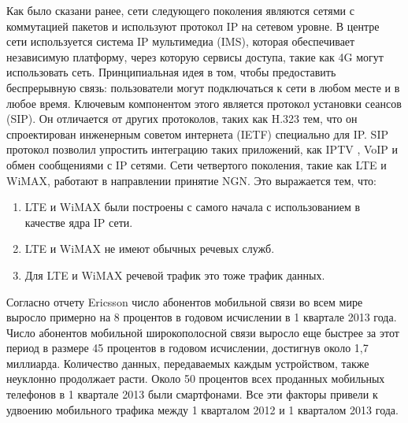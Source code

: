 Как было сказани ранее, сети следующего поколения являются сетями с коммутацией пакетов и используют протокол IP на сетевом уровне.
В центре сети используется система IP мультимедиа (IMS), которая обеспечивает независимую платформу, через которую сервисы доступа, такие как 4G могут использовать сеть.
Принципиальная идея в том, чтобы предоставить беспрерывную связь: пользователи могут подключаться к сети в любом месте и в любое время.
Ключевым компонентом этого является протокол установки сеансов (SIP).
Он отличается от других протоколов, таких как H.323 тем, что он спроектирован инженерным советом интернета (IETF) специально для IP.
SIP протокол позволил упростить интеграцию таких приложений, как IPTV , VoIP и обмен сообщениями с IP сетями.
Сети четвертого поколения, такие как LTE и WiMAX, работают в направлении принятие NGN. 
Это выражается тем, что:
\begin{enumerate}
 \item LTE и WiMAX были построены с самого начала с использованием в качестве ядра IP сети.
 \item LTE и WiMAX не имеют обычных речевых служб.
 \item Для LTE и WiMAX речевой трафик это тоже трафик данных.
\end{enumerate}




Согласно отчету Ericsson \cite{ericsson,ericsson_backgrounder,ericsson_volte} число абонентов мобильной связи во всем мире выросло примерно на 8 процентов в годовом исчислении в 1 квартале 2013 года. Число абонентов мобильной широкополосной связи выросло еще быстрее за этот период в размере 45 процентов в годовом исчислении, достигнув около 1,7 миллиарда. Количество данных, передаваемых каждым устройством, также неуклонно продолжает расти. Около 50 процентов всех проданных мобильных телефонов в 1 квартале 2013 были смартфонами. Все эти факторы привели к удвоению мобильного трафика между 1 кварталом 2012 и 1 кварталом 2013 года. 

